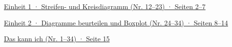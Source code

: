 \noindent\hyperlink{e1}{Einheit 1 · Streifen- und Kreisdiagramm (Nr. 12–23) · Seiten 2–7}\par\smallskip
\noindent\hyperlink{e2}{Einheit 2 · Diagramme beurteilen und Boxplot (Nr. 24–34) · Seiten 8–14}\par\smallskip
\noindent\hyperlink{abhaken}{Das kann ich (Nr. 1–34) · Seite 15}\par\smallskip
